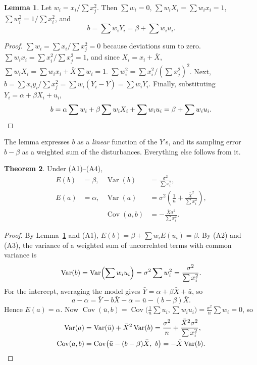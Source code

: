 \documentclass[11pt,a4paper]{article}
\numberwithin{equation}{section}
\DeclareMathOperator{\Var}{Var}
\DeclareMathOperator{\Cov}{Cov}
\theoremstyle{definition}
\newtheorem{thm}{Theorem}[subsection]
\newtheorem{lem}[thm]{Lemma}
\begin{document}
\begin{lem}
\label{lem:blinear}
Let $w_i = x_i/\sum x_j^2$. Then $\sum w_i = 0$, $\sum w_iX_i = \sum w_ix_i = 1$, $\sum w_i^2 = 1/\sum x_i^2$, and
\[
b = \sum w_iY_i = \beta + \sum w_iu_i .
\]
\end{lem}

\begin{proof}
$\sum w_i = \sum x_i/\sum x_j^2 = 0$ because deviations sum to zero. $\sum w_ix_i = \sum x_i^2/\sum x_j^2 = 1$, and since
$X_i = x_i + \bar X$, $\sum w_iX_i = \sum w_ix_i + \bar X\sum w_i = 1$. $\sum w_i^2 = \sum x_i^2/(\sum x_j^2)^2$. Next,
$b = \sum x_iy_i/\sum x_j^2 = \sum w_i(Y_i - \bar Y) = \sum w_iY_i$. Finally, substituting $Y_i = \alpha + \beta X_i + u_i$,
\[
b = \alpha\sum w_i + \beta\sum w_iX_i + \sum w_iu_i = \beta + \sum w_iu_i . \qedhere
\]
\end{proof}

The lemma expresses $b$ as a \emph{linear} function of the $Y$'s, and its sampling error $b - \beta$ as a weighted sum of the disturbances.
Everything else follows from it.

\begin{thm}
\label{thm:moments2}
Under (A1)--(A4),
\begin{align*}
E(b) &= \beta, & \Var(b) &= \frac{\sigma^2}{\sum x_i^2},\\
E(a) &= \alpha, & \Var(a) &= \sigma^2\left(\frac1n + \frac{\bar X^2}{\sum x_i^2}\right),\\
& & \Cov(a, b) &= -\frac{\bar X\sigma^2}{\sum x_i^2} .
\end{align*}
\end{thm}

\begin{proof}
By Lemma~\ref{lem:blinear} and (A1), $E(b) = \beta + \sum w_iE(u_i) = \beta$. By (A2) and (A3), the variance of a weighted sum of uncorrelated
terms with common variance is
\[
\Var(b) = \Var\Bigl(\sum w_iu_i\Bigr) = \sigma^2\sum w_i^2 = \frac{\sigma^2}{\sum x_i^2} .
\]
For the intercept, averaging the model gives $\bar Y = \alpha + \beta\bar X + \bar u$, so
\[
a - \alpha = \bar Y - b\bar X - \alpha = \bar u - (b - \beta)\bar X .
\]
Hence $E(a) = \alpha$. Now $\Cov(\bar u, b) = \Cov\bigl(\frac1n\sum u_i, \sum w_iu_i\bigr) = \frac{\sigma^2}{n}\sum w_i = 0$, so
\begin{align*}
\Var(a) &= \Var(\bar u) + \bar X^2\Var(b) = \frac{\sigma^2}{n} + \frac{\bar X^2\sigma^2}{\sum x_i^2},\\
\Cov(a, b) &= \Cov\bigl(\bar u - (b - \beta)\bar X,\ b\bigr) = -\bar X\Var(b) . \qedhere
\end{align*}
\end{proof}
\end{document}
